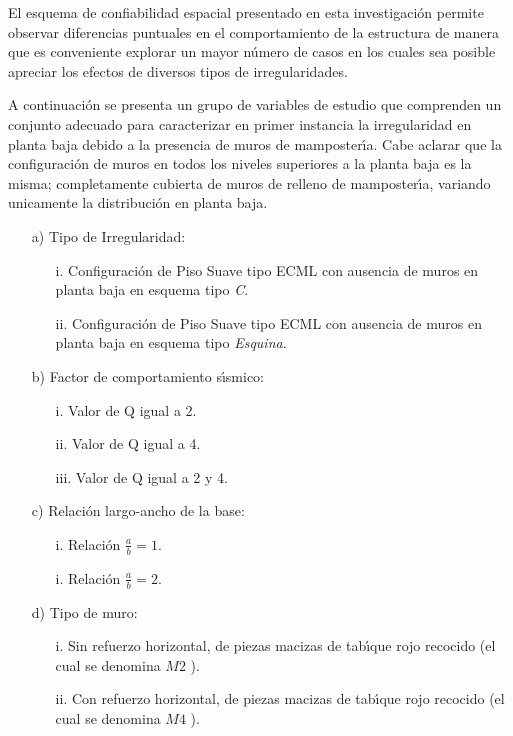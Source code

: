 El esquema de confiabilidad espacial presentado en esta investigaci\'on permite observar diferencias puntuales en el comportamiento de la estructura de manera que es conveniente explorar un mayor n\'umero de casos en los cuales sea posible apreciar los efectos de diversos tipos de irregularidades.

A continuaci\'on se presenta un grupo de variables de estudio que comprenden un conjunto adecuado para caracterizar en primer instancia la irregularidad en planta baja debido a la presencia de muros de mamposter\'{\i}a. Cabe aclarar que la configuraci\'on de muros en todos los niveles superiores a la planta baja es la misma; completamente cubierta de muros de relleno de mamposter\'{\i}a, variando unicamente la distribuci\'on en planta baja. 

\begin{itemize}
	\item [a)] Tipo de Irregularidad: 
	\begin{itemize}
				\item [i.] Configuraci\'on de	Piso Suave tipo ECML con ausencia de muros en planta baja en esquema tipo \emph{C}.
				\item [ii.] Configuraci\'on de Piso Suave tipo ECML con ausencia de muros en planta baja en esquema tipo \emph{Esquina}.				
	\end{itemize}
	\item [b)] Factor de comportamiento s\'{\i}smico: 
	\begin{itemize}
		\item [i.] Valor de Q igual a 2.
		\item [ii.] Valor de Q igual a 4.
		\item [iii.] Valor de Q igual a 2 y 4.				
	\end{itemize}
	\item [c)] Relaci\'on largo-ancho de la base: 
	\begin{itemize}
		\item [i.] Relaci\'on $\frac{a}{b}=1$.
		\item [i.] Relaci\'on $\frac{a}{b}=2$.		
	\end{itemize}
	\item [d)] Tipo de muro: 
	\begin{itemize}
		\item [i.] Sin refuerzo horizontal, de piezas macizas de tab\'{\i}que rojo recocido (el cual se denomina $M2$ \cite{AA2001}).
		\item [ii.] Con refuerzo horizontal, de piezas macizas de tab\'{\i}que rojo recocido (el cual se denomina $M4$ \cite{AA2001}).		
	\end{itemize}
\end{itemize}

